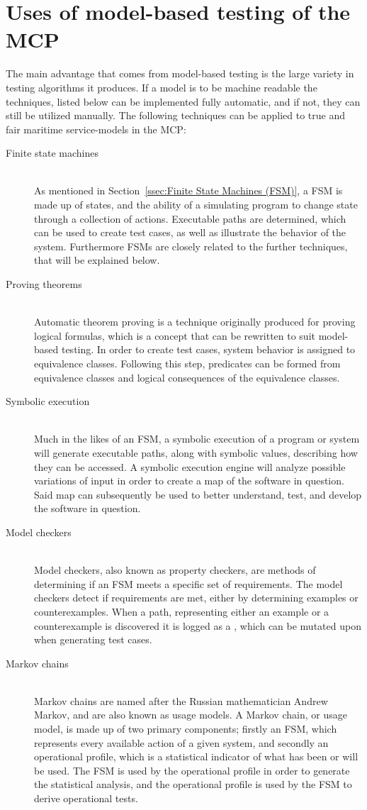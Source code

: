 \section{Uses of model-based testing of the MCP}
The main advantage that comes from model-based testing is the large variety in testing algorithms it produces. If a model is to be machine readable the techniques, listed below can be implemented fully automatic, and if not, they can still be utilized manually. The following techniques can be applied to true and fair maritime service-models in the MCP: \newpage
\begin{description}
  \item[Finite state machines]\ \\
    As mentioned in Section~\ref{ssec:Finite State Machines (FSM)}, a FSM is made up of states, and the ability of a simulating program to change state through a collection of actions. Executable paths are determined, which can be used to create test cases, as well as illustrate the behavior of the system. Furthermore FSMs are closely related to the further techniques, that will be explained below.
  \item[Proving theorems]\ \\
    Automatic theorem proving is a technique originally produced for proving logical formulas, which is a concept that can be rewritten to suit model-based testing. In order to create test cases, system behavior is assigned to equivalence classes. Following this step, predicates can be formed from equivalence classes and logical consequences of the equivalence classes. 
  \item[Symbolic execution]\ \\
    Much in the likes of an FSM, a symbolic execution of a program or system will generate executable paths, along with symbolic values, describing how they can be accessed. A symbolic execution engine will analyze possible variations of input in order to create a map of the software in question. Said map can subsequently be used to better understand, test, and develop the software in question.
  \item[Model checkers]\ \\
    Model checkers, also known as property checkers, are methods of determining if an FSM meets a specific set of requirements. The model checkers detect if requirements are met, either by determining examples or counterexamples. When a path, representing either an example or a counterexample is discovered it is logged as a , which can be mutated upon when generating test cases.
  \item[Markov chains]\ \\
    Markov chains are named after the Russian mathematician Andrew Markov, and are also known as usage models. A Markov chain, or usage model, is made up of two primary components; firstly an FSM, which represents every available action of a given system, and secondly an operational profile, which is a statistical indicator of what has been or will be used. The FSM is used by the operational profile in order to generate the statistical analysis, and the operational profile is used by the FSM to derive operational tests.
\end{description}
